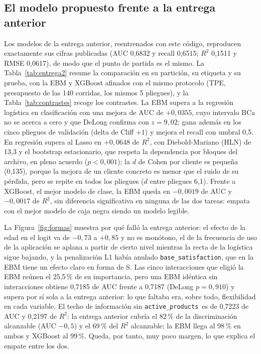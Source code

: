 \documentclass[pdflatex,sn-mathphys-num]{sn-jnl}
\newcommand{\ap}{\texttt{active\_products}}
\begin{document}
\subsection{El modelo propuesto frente a la entrega anterior}\label{sec:res_e2}

Los modelos de la entrega anterior, reentrenados con este código, reproducen exactamente sus cifras publicadas (AUC 0,6832 y recall 0,6515; $R^2$ 0,1511 y RMSE 0,0617), de modo que el punto de partida es el mismo. La Tabla~\ref{tab:entrega2} resume la comparación en su partición, su etiqueta y su prueba, con la EBM y XGBoost afinados con el mismo protocolo (TPE, presupuesto de las 140 corridas, los mismos 5 pliegues), y la Tabla~\ref{tab:contrastes} recoge los contrastes. La EBM supera a la regresión logística en clasificación con una mejora de AUC de $+0{,}0355$, cuyo intervalo BCa no se acerca a cero y que DeLong confirma con $z=9{,}02$; gana además en los cinco pliegues de validación (delta de Cliff $+1$) y mejora el recall con umbral 0,5. En regresión supera al Lasso en $+0{,}0648$ de $R^2$, con Diebold-Mariano (HLN) de 13,3 y el bootstrap estacionario, que respeta la dependencia por bloques del archivo, en pleno acuerdo ($p<0{,}001$); la $d$ de Cohen por cliente es pequeña (0,135), porque la mejora de un cliente concreto es menor que el ruido de su pérdida, pero se repite en todos los pliegues ($d$ entre pliegues 6,1). Frente a XGBoost, el mejor modelo de clase, la EBM queda en $-0{,}0019$ de AUC y $-0{,}0017$ de $R^2$, sin diferencia significativa en ninguna de las dos tareas: empata con el mejor modelo de caja negra siendo un modelo legible.




La Figura~\ref{fig:formas} muestra por qué falló la entrega anterior: el efecto de la edad en el logit va de $-0{,}73$ a $+0{,}85$ y no es monótono, el de la frecuencia de uso de la aplicación se aplana a partir de cierto nivel mientras la recta de la logística sigue bajando, y la penalización L1 había anulado \texttt{base\_satisfaction}, que en la EBM tiene un efecto claro en forma de S. Las cinco interacciones que eligió la EBM reúnen el 25,5\,\% de su importancia, pero una EBM idéntica sin interacciones obtiene 0,7185 de AUC frente a 0,7187 (DeLong $p=0{,}910$) y supera por sí sola a la entrega anterior: lo que faltaba era, sobre todo, flexibilidad en cada variable. El techo de información sin \ap\ es de 0,7223 de AUC y 0,2197 de $R^2$: la entrega anterior cubría el 82\,\% de la discriminación alcanzable (AUC $-0{,}5$) y el 69\,\% del $R^2$ alcanzable; la EBM llega al 98\,\% en ambos y XGBoost al 99\,\%. Queda, por tanto, muy poco margen, lo que explica el empate entre los dos.
\end{document}
